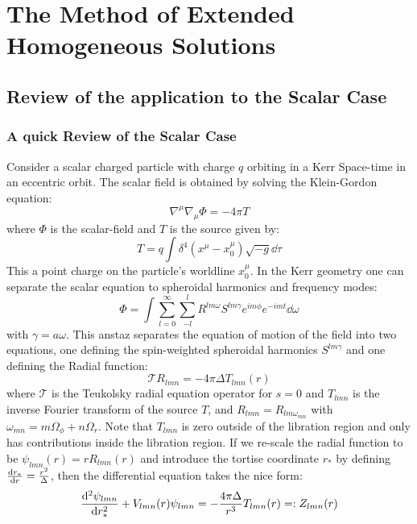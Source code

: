 \documentclass[preprint,showpacs,preprintnumbers,amssymb,superscriptaddress,aps,prd,nofootinbib,11pt]{revtex4-1}
\begin{document}
\section{The Method of Extended Homogeneous Solutions}
\subsection{Review of the application to the Scalar Case \cite{Warburton_2011}}
\subsubsection{A quick Review of the Scalar Case}
Consider a scalar charged particle with charge $q$ orbiting in a Kerr Space-time in an eccentric orbit. The scalar field is obtained by solving the Klein-Gordon equation:
\begin{equation}
    \nabla^\mu \nabla_\mu \Phi = - 4\pi T
\end{equation}
where $\Phi$ is the scalar-field and $T$ is the source given by:
\begin{equation}
    T = q \int \delta^4(x^\mu - x_0^\mu) \sqrt{-g} \dd \tau
\end{equation}
This a point charge on the particle's worldline $x_0^\mu$. In the Kerr geometry one can separate the scalar equation to spheroidal harmonics and frequency modes:
\begin{equation}
    \Phi = \int \sum\limits_{l=0}^\infty \sum \limits_{-l}^{l} R^{lm\omega} S^{lm\gamma} e^{im\phi} e^{-imt} \dd \omega
\end{equation}
with $\gamma = a \omega$. This anstaz separates the equation of motion of the field into two equations, one defining the spin-weighted spheroidal harmonics $S^{lm\gamma}$ and one defining the Radial function:
\begin{equation}
    \mathcal{T} R_{lmn} = -4\pi \Delta T_{lmn}(r)
\end{equation}
where $\mathcal{T}$ is the Teukolsky radial equation operator for $s=0$ and $T_{lmn}$ is the inverse Fourier transform of the source $T$, and $R_{lmn} = R_{lm \omega_{mn}}$ with $\omega_{mn} = m \Omega_\phi + n \Omega_r$. Note that $T_{lmn}$ is zero outside of the libration region and only has contributions inside the libration region. If we re-scale the radial function to be $\psi_{lmn} (r) = r R_{lmn}(r)$ and introduce the tortise coordinate $r_*$ by defining $\dv{r_*}{r} = \frac{r^2}{\Delta}$, then the differential equation takes the nice form:
 \begin{equation}
     \dv[2]{\psi_{lmn}}{r_*}  + V_{lmn} (r)\psi_{lmn} = -\frac{4\pi \Delta}{r^3} T_{lmn}(r) =: Z_{lmn}(r) \label{eqn:radialEquation}
 \end{equation}
\end{document}
